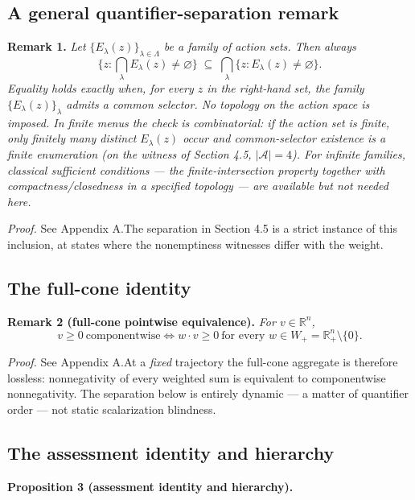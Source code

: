 \documentclass[3p,11pt]{elsarticle}
\begin{document}
\subsection{A general quantifier-separation
remark}\label{a-general-quantifier-separation-remark}

\textbf{Remark 1.} \emph{Let \(\{E_\lambda(z)\}_{\lambda \in \Lambda}\)
be a family of action sets. Then always}
\[\Big\{ z : \textstyle\bigcap_{\lambda} E_\lambda(z) \neq \varnothing \Big\} \;\subseteq\; \bigcap_{\lambda} \big\{ z : E_\lambda(z) \neq \varnothing \big\}.\]
\emph{Equality holds exactly when, for every \(z\) in the right-hand
set, the family \(\{E_\lambda(z)\}_\lambda\) admits a common selector.
No topology on the action space is imposed. In finite menus the check is
combinatorial: if the action set is finite, only finitely many distinct
\(E_\lambda(z)\) occur and common-selector existence is a finite
enumeration (on the witness of Section 4.5, \(|\mathcal{A}| = 4\)). For
infinite families, classical sufficient conditions --- the
finite-intersection property together with compactness/closedness in a specified topology --- are available but not needed here.}

\emph{Proof.} See Appendix A.The separation in Section 4.5 is a strict instance of this inclusion, at states where the nonemptiness witnesses differ with the weight.

\subsection{The full-cone identity}\label{the-full-cone-identity}

\textbf{Remark 2 (full-cone pointwise equivalence).} \emph{For
\(v \in \mathbb{R}^n\),}
\[v \ge 0 \ \text{componentwise} \iff w \cdot v \ge 0 \ \text{for every } w \in W_+ = \mathbb{R}^n_+ \setminus \{0\}.\]

\emph{Proof.} See Appendix A.At a \emph{fixed} trajectory the full-cone aggregate is therefore lossless: nonnegativity of every weighted sum is equivalent to componentwise nonnegativity. The separation below is entirely dynamic --- a matter of quantifier order --- not static scalarization blindness.

\subsection{The assessment identity and
hierarchy}\label{the-assessment-identity-and-hierarchy}

\textbf{Proposition 3 (assessment identity and hierarchy).}
\end{document}
